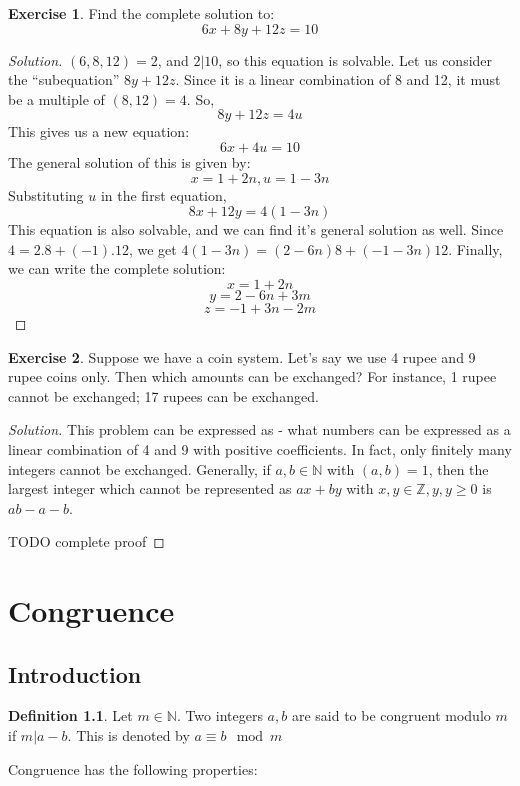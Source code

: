 \documentclass[12pt,letterpaper]{amsbook}
\theoremstyle{definition}
\newtheorem{definition}{Definition} %
\newtheorem*{exercise}{Exercise}
\newenvironment{solution}
  {\renewcommand\qedsymbol{$\blacksquare$}\begin{proof}[Solution]}
  {\end{proof}}
\newcommand{\N}{\mathbb{N}}
\newcommand{\Z}{\mathbb{Z}}
\begin{document}
\begin{exercise}
  Find the complete solution to:
  \[6x+8y+12z=10\]
\end{exercise}
\begin{solution}
  $(6,8,12)  = 2$, and $2|10$, so this equation is solvable.
  Let us consider the ``subequation'' $8y+12z$. Since it is a linear combination of 8 and 12, it must be a multiple of $(8,12) = 4$. So,
  \[8y+12z = 4u\]
  This gives us a new equation:
  \[6x+4u = 10\]
  The general solution of this is given by:
  \[x = 1+2n, u = 1-3n\]
  Substituting $u$ in the first equation,
  \[8x+12y = 4(1-3n)\]
  This equation is also solvable, and we can find it's general solution as well. Since $4=2.8 + (-1).12$, we get $4(1-3n) = (2-6n)8 + (-1-3n)12$. Finally, we can write the complete solution:
  \[x = 1+2n\]
  \[y = 2-6n + 3m\]
  \[z = -1+3n -2m\]
\end{solution}

\begin{exercise}
  Suppose we have a coin system. Let's say we use 4 rupee and 9 rupee coins only. Then which amounts can be exchanged? For instance, 1 rupee cannot be exchanged; 17 rupees can be exchanged. 
\end{exercise}
\begin{solution}
  This problem can be expressed as - what numbers can be expressed as a linear combination of 4 and 9 with positive coefficients.
  In fact, only finitely many integers cannot be exchanged. Generally, if $a,b \in \N$ with $(a,b) = 1$, then the largest integer which cannot be represented as $ax+by$ with $x,y \in \Z, y,y \geq 0$ is $ab-a-b$.

  TODO complete proof
\end{solution}

\chapter{Congruence}

\section{Introduction}

\begin{definition}
  Let $m \in \N$. Two integers $a,b$ are said to be congruent modulo $m$ if $m|a-b$. This is denoted by $a \equiv b \mod m$  
\end{definition}

Congruence has the following properties:
\end{document}
